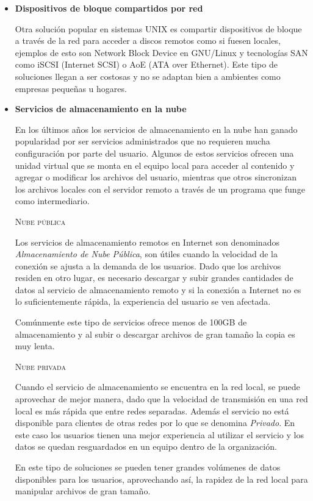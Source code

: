 \begin{itemize}
      \item \textbf{Dispositivos de bloque compartidos por red}

Otra soluci\'{o}n popular en sistemas UNIX es compartir dispositivos de bloque a trav\'{e}s de la red para acceder a discos remotos como si fuesen locales, ejemplos de esto son Network Block Device en GNU/Linux y tecnolog\'{i}as SAN como iSCSI (Internet SCSI) o AoE (ATA over Ethernet). Este tipo de soluciones llegan a ser costosas y no se adaptan bien a ambientes como empresas peque\~{n}as u hogares.
    
      \item \textbf{Servicios de almacenamiento en la nube}

En los \'{u}ltimos a\~{n}os los servicios de almacenamiento en la nube han ganado popularidad por ser servicios administrados que no requieren mucha configuraci\'{o}n por parte del usuario. Algunos de estos servicios ofrecen una unidad virtual que se monta en el equipo local para acceder al contenido y agregar o modificar los archivos del usuario, mientras que otros sincronizan los archivos locales con el servidor remoto a trav\'{e}s de un programa que funge como intermediario.

        \textsc{Nube p\'{u}blica}

Los servicios de almacenamiento remotos en Internet son denominados \emph{Almacenamiento de Nube P\'{u}blica}, son \'{u}tiles cuando la velocidad de la conexi\'{o}n se ajusta a la demanda de los usuarios. Dado que los archivos residen en otro lugar, es necesario descargar y subir grandes cantidades de datos al servicio de almacenamiento remoto y si la conexi\'{o}n a Internet no es lo suficientemente r\'{a}pida, la experiencia del usuario se ven afectada.

Com\'{u}nmente este tipo de servicios ofrece menos de 100GB de almacenamiento y al subir o descargar archivos de gran tama\~{n}o la copia es muy lenta.

        \textsc{Nube privada}

Cuando el servicio de almacenamiento se encuentra en la red local, se puede aprovechar de mejor manera, dado que la velocidad de transmisi\'{o}n en una red local es m\'{a}s r\'{a}pida que entre redes separadas. Adem\'{a}s el servicio no est\'{a} disponible para clientes de otras redes por lo que se denomina \emph{Privado}. En este caso los usuarios tienen una mejor experiencia al utilizar el servicio y los datos se quedan resguardados en un equipo dentro de la organizaci\'{o}n.

En este tipo de soluciones se pueden tener grandes vol\'{u}menes de datos disponibles para los usuarios, aprovechando as\'{i}, la rapidez de la red local para manipular archivos de gran tama\~{n}o.

    \end{itemize}

